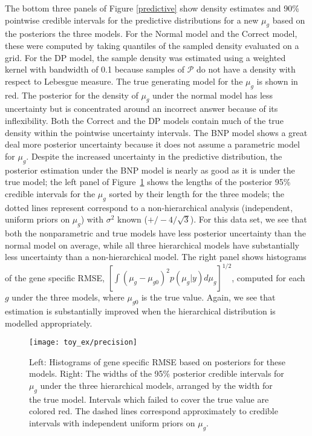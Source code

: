 The bottom three panels of Figure \ref{predictive} show density estimates and 90\% pointwise credible intervals for the predictive distributions for a new $\mu_g$ based on the posteriors the three models. For the Normal model and the Correct model, these were computed by taking quantiles of the sampled density evaluated on a grid. For the DP model, the sample density was estimated using a weighted kernel with bandwidth of 0.1 because samples of $\mathcal{P}$ do not have a density with respect to Lebesgue measure. The true generating model for the $\mu_g$ is shown in red. The posterior for the density of $\mu_g$ under the normal model has less uncertainty but is concentrated around an incorrect answer because of its inflexibility. Both the Correct and the DP models contain much of the true density within the pointwise uncertainty intervals. The BNP model shows a great deal more posterior uncertainty because it does not assume a parametric model for $\mu_g$. Despite the increased uncertainty in the predictive distribution, the posterior estimation under the BNP model is nearly as good as it is under the true model; the left panel of Figure~\ref{precision} shows the lengths of the posterior 95\% credible intervals for the $\mu_g$ sorted by their length for the three models; the dotted lines represent correspond to a non-hierarchical analysis (independent, uniform priors on $\mu_g$) with $\sigma^2$ known ($+/- 4/\sqrt{3}$). For this data set, we see that both the nonparametric and true models have less posterior uncertainty than the normal model on average, while all three hierarchical models have substantially less uncertainty than a non-hierarchical model. The right panel shows histograms of the gene specific RMSE, $[\int (\mu_g - \mu_{g0})^2 p(\mu_g|y) d\mu_g]^{1/2}$, computed for each $g$ under the three models, where $\mu_{g0}$ is the true value. Again, we see that estimation is substantially improved when the hierarchical distribution is modelled appropriately.


\begin{figure}[h!]
\centering
\texttt{[image: toy\_ex/precision]}
\begin{minipage}{.8\textwidth}
\caption{\small Left: Histograms of gene specific RMSE based on posteriors for these models. Right: The widths of the 95\% posterior credible intervals for $\mu_g$ under the three hierarchical models, arranged by the width for the true model. Intervals which failed to cover the true value are colored red. The dashed lines correspond approximately to credible intervals with independent uniform priors on $\mu_g$.}
\label{precision}
\end{minipage}
\end{figure}


